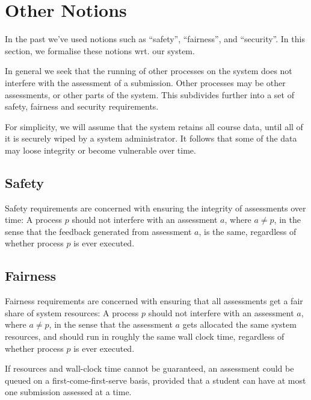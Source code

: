 
\section{Other Notions}

In the past we've used notions such as ``safety'', ``fairness'', and
``security''.  In this section, we formalise these notions wrt. our system.

In general we seek that the running of other processes on the system does not
interfere with the assessment of a submission. Other processes may be other
assessments, or other parts of the system. This subdivides further into a set
of safety, fairness and security requirements.

For simplicity, we will assume that the system retains all course data, until
all of it is securely wiped by a system administrator. It follows that some of
the data may loose integrity or become vulnerable over time.



\subsection{Safety}

Safety requirements are concerned with ensuring the integrity of assessments
over time: A process $p$ should not interfere with an assessment $a$, where
$a\neq p$, in the sense that the feedback generated from assessment $a$, is the
same, regardless of whether process $p$ is ever executed.

\subsection{Fairness}

Fairness requirements are concerned with ensuring that all assessments get a
fair share of system resources: A process $p$ should not interfere with an
assessment $a$, where $a\neq p$, in the sense that the assessment $a$ gets
allocated the same system resources, and should run in roughly the same wall
clock time, regardless of whether process $p$ is ever executed.

If resources and wall-clock time cannot be guaranteed, an assessment could be
queued on a first-come-first-serve basis, provided that a student can have at
most one submission assessed at a time.


